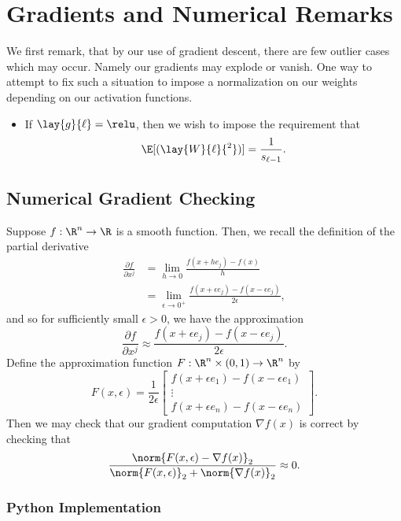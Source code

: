 

\section{Gradients and Numerical Remarks}

We first remark, that by our use of gradient descent, there are few outlier cases which may occur.  Namely our gradients may explode or vanish.  One way to attempt to fix such a situation to impose a normalization on our weights depending on our activation functions.
\begin{itemize}
	\item If $\lay{g}{\ell}=\relu$, then we wish to impose the requirement that
		$$\E[(\lay{W}{\ell}{^2})]=\frac{1}{s_{\ell-1}}.$$
\end{itemize}


\subsection{Numerical Gradient Checking}

Suppose $f:\R^n\to\R$ is a smooth function.  Then, we recall the definition of the partial derivative
\begin{align*}
	\frac{\partial f}{\partial x^j}&=\lim_{h\to0}\frac{f(x+he_j)-f(x)}{h}\\
	&=\lim_{\epsilon\to0^+}\frac{f(x+\epsilon e_j)-f(x-\epsilon e_j)}{2\epsilon},
\end{align*}
and so for sufficiently small $\epsilon>0$, we have the approximation
$$\frac{\partial f}{\partial x^j}\approx \frac{f(x+\epsilon e_j)-f(x-\epsilon e_j)}{2\epsilon}.$$
Define the approximation function $F:\R^n\times (0,1)\to\R^n$ by
$$F(x,\epsilon)=\frac{1}{2\epsilon}\begin{bmatrix}
	f(x+\epsilon e_1)-f(x-\epsilon e_1)\\
	\vdots\\
	f(x+\epsilon e_n)-f(x-\epsilon e_n)
\end{bmatrix}.$$
Then we may check that our gradient computation $\nabla f(x)$ is correct by checking that
$$\frac{\norm{F(x,\epsilon)-\nabla f(x)}_2}{\norm{F(x,\epsilon)}_2+\norm{\nabla f(x)}_2}\approx 0.$$

\subsubsection{Python Implementation}




